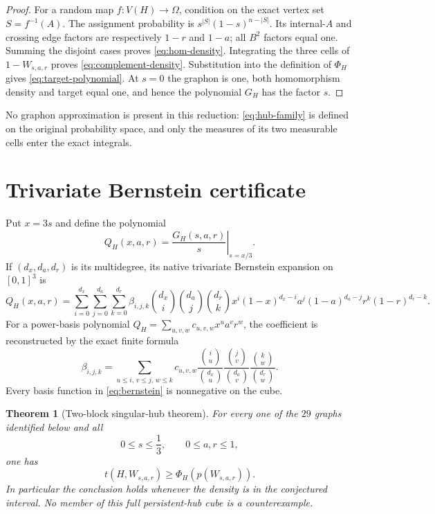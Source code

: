 \documentclass[11pt]{article}
\newtheorem{theorem}{Theorem}[section]
\begin{document}
\begin{proof}
For a random map $f:V(H)\to\Omega$, condition on the exact vertex set
$S=f^{-1}(A)$.  The assignment probability is
$s^{|S|}(1-s)^{n-|S|}$.  Its internal-$A$ and crossing edge factors are
respectively $1-r$ and $1-a$; all $B^2$ factors equal one.  Summing the
disjoint cases proves \eqref{eq:hom-density}.  Integrating the three cells of
$1-W_{s,a,r}$ proves \eqref{eq:complement-density}.  Substitution into the
definition of $\Phi_H$ gives \eqref{eq:target-polynomial}.  At $s=0$ the
graphon is one, both homomorphism density and target equal one, and hence the
polynomial $G_H$ has the factor $s$.
\end{proof}

No graphon approximation is present in this reduction: \eqref{eq:hub-family}
is defined on the original probability space, and only the measures of its
two measurable cells enter the exact integrals.


\section{Trivariate Bernstein certificate}

Put $x=3s$ and define the polynomial
\begin{equation}
 Q_H(x,a,r)=\left.\frac{G_H(s,a,r)}s\right|_{s=x/3}.
 \label{eq:quotient}
\end{equation}
If $(d_x,d_a,d_r)$ is its multidegree, its native trivariate Bernstein
expansion on $[0,1]^3$ is
\begin{equation}
 Q_H(x,a,r)=
 \sum_{i=0}^{d_x}\sum_{j=0}^{d_a}\sum_{k=0}^{d_r}
 \beta_{i,j,k}
 \binom{d_x}{i}\binom{d_a}{j}\binom{d_r}{k}
 x^i(1-x)^{d_x-i}
 a^j(1-a)^{d_a-j}
 r^k(1-r)^{d_r-k}.
 \label{eq:bernstein}
\end{equation}
For a power-basis polynomial
$Q_H=\sum_{u,v,w}c_{u,v,w}x^ua^vr^w$, the coefficient is reconstructed by
the exact finite formula
\begin{equation}
 \beta_{i,j,k}=
 \sum_{u\leq i,\,v\leq j,\,w\leq k}
 c_{u,v,w}
 \frac{\binom iu}{\binom{d_x}u}
 \frac{\binom jv}{\binom{d_a}v}
 \frac{\binom kw}{\binom{d_r}w}.
 \label{eq:coefficient-formula}
\end{equation}
Every basis function in \eqref{eq:bernstein} is nonnegative on the cube.

\begin{theorem}[Two-block singular-hub theorem]
\label{thm:hub}
For every one of the $29$ graphs identified below and all
\[
 0\leq s\leq\frac13,
 \qquad0\leq a,r\leq1,
\]
one has
\begin{equation}
 t(H,W_{s,a,r})\geq\Phi_H(p(W_{s,a,r})).
 \label{eq:main}
\end{equation}
In particular the conclusion holds whenever the density is in the
conjectured interval.  No member of this full persistent-hub cube is a
counterexample.
\end{theorem}
\end{document}
